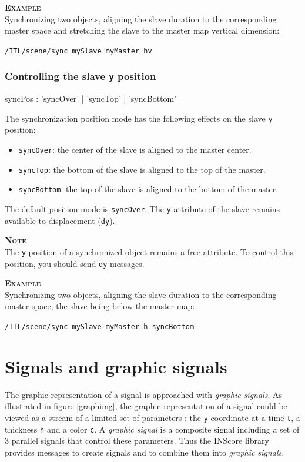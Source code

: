 \documentclass[a4paper,twoside]{report}
\newcommand{\toplevel}[1]	{\chapter{#1}}
\newcommand{\subsublevel}[1]	{\subsection{#1}}
\newcommand{\OSC}[1]		{\texttt{#1}}
\newcommand{\values}[1]	{\texttt{#1}}
\newcommand{\example}		{\textbf{\hspace{-1.5cm}\textbf{\textsc{Example }}}}
\newcommand{\note}	[1]		{\vspace{2mm}\textbf{\hspace{-1.03cm}\textbf{\textsc{Note #1}}}}
\newcommand{\sample}	[1]			{\vspace{-2mm}\begin{center}\colorbox{mygrey}{
								\begin{minipage}[t]{0.9\columnwidth} 
								{\small \texttt{#1}}
								\end{minipage}}\end{center}}
\begin{document}
\example \\
Synchronizing two objects, aligning the slave duration to the corresponding master space and stretching the slave to the master map vertical dimension:
\sample{/ITL/scene/sync mySlave myMaster hv}


\subsublevel{Controlling the slave \OSC{y} position}

\begin{rail}
syncPos : 'syncOver' | 'syncTop' | 'syncBottom'
\end{rail}

The synchronization position mode has the following effects on the slave \values{y} position:
\begin{itemize}
\item \OSC{syncOver}: the center of the slave is aligned to the master center.
\item \OSC{syncTop}: the bottom of the slave is aligned to the top of the master.
\item \OSC{syncBottom}: the top of the slave is aligned to the bottom of the master.
\end{itemize}
The default position mode is \OSC{syncOver}. The \OSC{y} attribute of the slave remains available to displacement (\OSC{dy}). 

\note{} \\
The \values{y} position of a synchronized object remains a free attribute. To control this position, you should send \OSC{dy} messages.  

\example \\
Synchronizing two objects, aligning the slave duration to the corresponding master space, the slave being below the master map:
\sample{/ITL/scene/sync mySlave myMaster h syncBottom}


\toplevel{Signals and graphic signals}
\label{graphsig}

The graphic representation of a signal is approached with \emph{graphic signals}. As illustrated in figure \ref{graphimg}, the graphic representation of a signal could be viewed as a stream of a limited set of parameters : the \values{y} coordinate at a time \values{t}, a thickness \values{h} and a color \values{c}. 
A \emph{graphic signal} is a composite signal including a set of 3 parallel signals that control these parameters. Thus the INScore library provides messages to create signals and to combine them into \emph{graphic signals}. 
\end{document}
